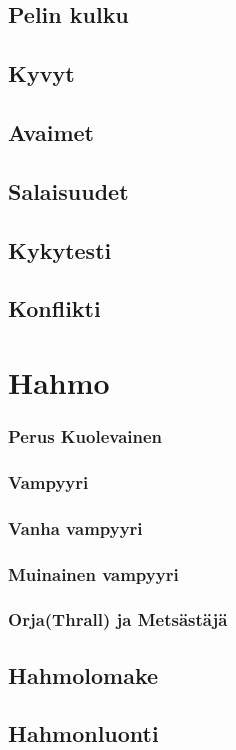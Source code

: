 \documentclass[a4paper, 12pt, finnish]{article}
\begin{document}
{	\subsection{Pelin kulku}
	\subsection{Kyvyt}
	\subsection{Avaimet}
	\subsection{Salaisuudet}
	\subsection{Kykytesti}
	\subsection{Konflikti}
\section{Hahmo}
	\subsubsection{Perus Kuolevainen}
	\subsubsection{Vampyyri}
	\subsubsection{Vanha vampyyri}
	\subsubsection{Muinainen vampyyri}
	\subsubsection{Orja(Thrall) ja Metsästäjä}
	\subsection{Hahmolomake}
	\subsection{Hahmonluonti}
}
\end{document}

